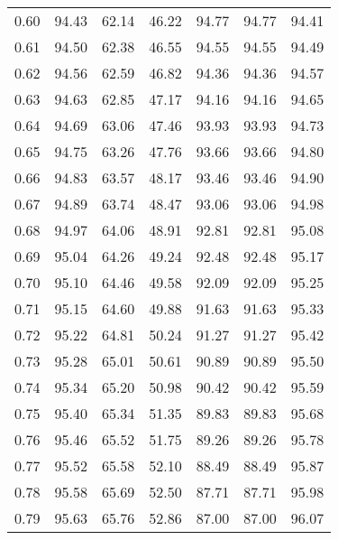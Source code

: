 \begin{tabular}{|c|c|c|c|c|c|c|}
      0.60 &     94.43 &     62.14 &      46.22 &   94.77 &      94.77 &         94.41 \\
      0.61 &     94.50 &     62.38 &      46.55 &   94.55 &      94.55 &         94.49 \\
      0.62 &     94.56 &     62.59 &      46.82 &   94.36 &      94.36 &         94.57 \\
      0.63 &     94.63 &     62.85 &      47.17 &   94.16 &      94.16 &         94.65 \\
      0.64 &     94.69 &     63.06 &      47.46 &   93.93 &      93.93 &         94.73 \\
      0.65 &     94.75 &     63.26 &      47.76 &   93.66 &      93.66 &         94.80 \\
      0.66 &     94.83 &     63.57 &      48.17 &   93.46 &      93.46 &         94.90 \\
      0.67 &     94.89 &     63.74 &      48.47 &   93.06 &      93.06 &         94.98 \\
      0.68 &     94.97 &     64.06 &      48.91 &   92.81 &      92.81 &         95.08 \\
      0.69 &     95.04 &     64.26 &      49.24 &   92.48 &      92.48 &         95.17 \\
      0.70 &     95.10 &     64.46 &      49.58 &   92.09 &      92.09 &         95.25 \\
      0.71 &     95.15 &     64.60 &      49.88 &   91.63 &      91.63 &         95.33 \\
      0.72 &     95.22 &     64.81 &      50.24 &   91.27 &      91.27 &         95.42 \\
      0.73 &     95.28 &     65.01 &      50.61 &   90.89 &      90.89 &         95.50 \\
      0.74 &     95.34 &     65.20 &      50.98 &   90.42 &      90.42 &         95.59 \\
      0.75 &     95.40 &     65.34 &      51.35 &   89.83 &      89.83 &         95.68 \\
      0.76 &     95.46 &     65.52 &      51.75 &   89.26 &      89.26 &         95.78 \\
      0.77 &     95.52 &     65.58 &      52.10 &   88.49 &      88.49 &         95.87 \\
      0.78 &     95.58 &     65.69 &      52.50 &   87.71 &      87.71 &         95.98 \\
      0.79 &     95.63 &     65.76 &      52.86 &   87.00 &      87.00 &         96.07 \\

\end{tabular}
